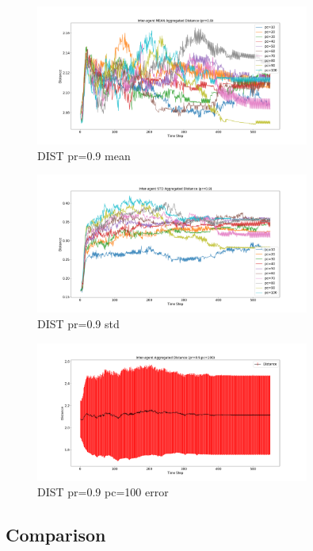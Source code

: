 \documentclass[12pt,a4paper]{IEEEtran}
\begin{document}
\begin{figure}[H]
	\begin{center}
		\includegraphics[width=9cm]{figures/dist-pr-0.9-mean}
	\end{center}
	\caption{DIST pr=0.9 mean}
\end{figure}

\begin{figure}[H]
	\begin{center}
		\includegraphics[width=9cm]{figures/dist-pr-0.9-std}
	\end{center}
	\caption{DIST pr=0.9 std}
\end{figure}

\begin{figure}[H]
	\begin{center}
		\includegraphics[width=9cm]{figures/dist-pr-0.9-pc-100-error}
	\end{center}
	\caption{DIST pr=0.9 pc=100 error }
\end{figure}


\subsection{Comparison}
\end{document}
